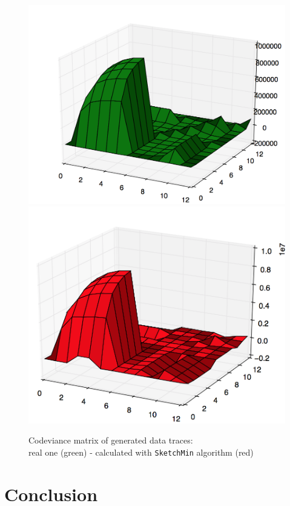 \documentclass[a4paper]{article}%
\begin{document}
\begin{figure}[H]
	\centering
	\includegraphics[scale=0.23]{generated_real.png}
	\includegraphics[scale=0.23]{generated_sk.png}
	\caption{\footnotesize Codeviance matrix of generated data traces:\\real one (green) - calculated with \texttt{SketchMin} algorithm (red)}
	\label{ref:exp_artificial}
\end{figure}


\section*{Conclusion}

\clearpage
\end{document}
